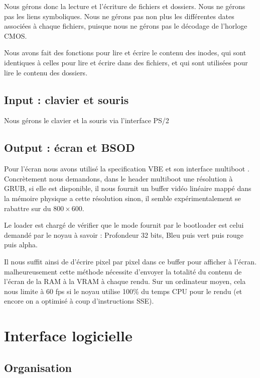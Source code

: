 \documentclass[12pt]{report}
\begin{document}
Nous gérons donc la lecture et l'écriture de fichiers et dossiers. Nous ne gérons pas les liens symboliques.
Nous ne gérons pas non plus les différentes dates associées à chaque fichiers, puisque nous ne gérons pas le décodage de l'horloge CMOS.

Nous avons fait des fonctions pour lire et écrire le contenu des inodes, qui sont identiques à celles pour lire et écrire dans des fichiers, et qui sont utilisées pour lire le contenu des dossiers.

\section{Input : clavier et souris}

Nous gérons le clavier et la souris via l'interface PS/2

\section{Output : écran et BSOD}

Pour l'écran nous avons utilisé la specification VBE \cite{specVBE} et son
interface multiboot \cite{multiboot}.
Concrètement nous demandons, dans le header multiboot une résolution à GRUB, si
elle est disponible, il nous fournit un buffer vidéo linéaire mappé dans la
mémoire physique a cette résolution sinon, il semble expérimentalement se
rabattre sur du $800 \times 600$.

Le loader est chargé de vérifier que le mode fournit par le bootloader est celui
demandé par le noyau à savoir : Profondeur 32 bits, Bleu puis vert puis rouge
puis alpha.

Il nous suffit ainsi de d'écrire pixel par pixel dans ce buffer pour afficher à
l'écran. malheureusement cette méthode nécessite d'envoyer la totalité du
contenu de l'écran de la RAM à la VRAM à chaque rendu. Sur un ordinateur moyen,
cela nous limite à 60 fps si le noyau utilise 100\% du temps CPU pour le rendu
(et encore on a optimisé à coup d'instructions SSE).

\chapter{Interface logicielle}

\section{Organisation}
\end{document}
